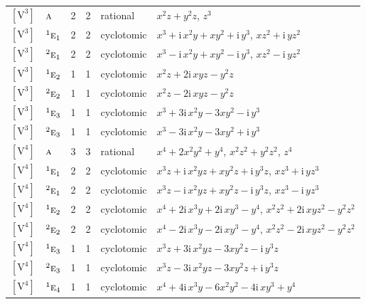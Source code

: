 \documentclass[10pt,a4paper]{article}
\numberwithin{equation}{section}
\newcommand{\irr}[1]{\text{\normalfont\scshape #1}}
\newcommand{\conjpair}[1]{{}^{#1}}
\newcommand{\iunit}{\mathrm{i}}
\newcommand{\jahn}[1]{\mathrm{#1}}
\newlength{\fillwidth}\newlength{\cellwidth}\newlength{\colwidth}
\begin{document}
{\begin{longtable}{@{}llrrl>{\RaggedRight\arraybackslash}p{\fillwidth}@{}}
$\jahn{[V^{3}]}$ & $\irr{a}$ & 2 & 2 & rational & $x^{2}z + y^{2}z$, $z^{3}$\\
$\jahn{[V^{3}]}$ & $\conjpair{1}\irr{e}_{1}$ & 2 & 2 & cyclotomic & $x^{3} + \iunit{}\,x^{2}y + xy^{2} + \iunit{}\,y^{3}$, $xz^{2} + \iunit{}\,yz^{2}$\\
$\jahn{[V^{3}]}$ & $\conjpair{2}\irr{e}_{1}$ & 2 & 2 & cyclotomic & $x^{3} - \iunit{}\,x^{2}y + xy^{2} - \iunit{}\,y^{3}$, $xz^{2} - \iunit{}\,yz^{2}$\\
$\jahn{[V^{3}]}$ & $\conjpair{1}\irr{e}_{2}$ & 1 & 1 & cyclotomic & $x^{2}z + 2\iunit{}\,xyz - y^{2}z$\\
$\jahn{[V^{3}]}$ & $\conjpair{2}\irr{e}_{2}$ & 1 & 1 & cyclotomic & $x^{2}z - 2\iunit{}\,xyz - y^{2}z$\\
$\jahn{[V^{3}]}$ & $\conjpair{1}\irr{e}_{3}$ & 1 & 1 & cyclotomic & $x^{3} + 3\iunit{}\,x^{2}y - 3xy^{2} - \iunit{}\,y^{3}$\\
$\jahn{[V^{3}]}$ & $\conjpair{2}\irr{e}_{3}$ & 1 & 1 & cyclotomic & $x^{3} - 3\iunit{}\,x^{2}y - 3xy^{2} + \iunit{}\,y^{3}$\\
$\jahn{[V^{4}]}$ & $\irr{a}$ & 3 & 3 & rational & $x^{4} + 2x^{2}y^{2} + y^{4}$, $x^{2}z^{2} + y^{2}z^{2}$, $z^{4}$\\
$\jahn{[V^{4}]}$ & $\conjpair{1}\irr{e}_{1}$ & 2 & 2 & cyclotomic & $x^{3}z + \iunit{}\,x^{2}yz + xy^{2}z + \iunit{}\,y^{3}z$, $xz^{3} + \iunit{}\,yz^{3}$\\
$\jahn{[V^{4}]}$ & $\conjpair{2}\irr{e}_{1}$ & 2 & 2 & cyclotomic & $x^{3}z - \iunit{}\,x^{2}yz + xy^{2}z - \iunit{}\,y^{3}z$, $xz^{3} - \iunit{}\,yz^{3}$\\
$\jahn{[V^{4}]}$ & $\conjpair{1}\irr{e}_{2}$ & 2 & 2 & cyclotomic & $x^{4} + 2\iunit{}\,x^{3}y + 2\iunit{}\,xy^{3} - y^{4}$, $x^{2}z^{2} + 2\iunit{}\,xyz^{2} - y^{2}z^{2}$\\
$\jahn{[V^{4}]}$ & $\conjpair{2}\irr{e}_{2}$ & 2 & 2 & cyclotomic & $x^{4} - 2\iunit{}\,x^{3}y - 2\iunit{}\,xy^{3} - y^{4}$, $x^{2}z^{2} - 2\iunit{}\,xyz^{2} - y^{2}z^{2}$\\
$\jahn{[V^{4}]}$ & $\conjpair{1}\irr{e}_{3}$ & 1 & 1 & cyclotomic & $x^{3}z + 3\iunit{}\,x^{2}yz - 3xy^{2}z - \iunit{}\,y^{3}z$\\
$\jahn{[V^{4}]}$ & $\conjpair{2}\irr{e}_{3}$ & 1 & 1 & cyclotomic & $x^{3}z - 3\iunit{}\,x^{2}yz - 3xy^{2}z + \iunit{}\,y^{3}z$\\
$\jahn{[V^{4}]}$ & $\conjpair{1}\irr{e}_{4}$ & 1 & 1 & cyclotomic & $x^{4} + 4\iunit{}\,x^{3}y - 6x^{2}y^{2} - 4\iunit{}\,xy^{3} + y^{4}$\\

\end{longtable}}
\end{document}
